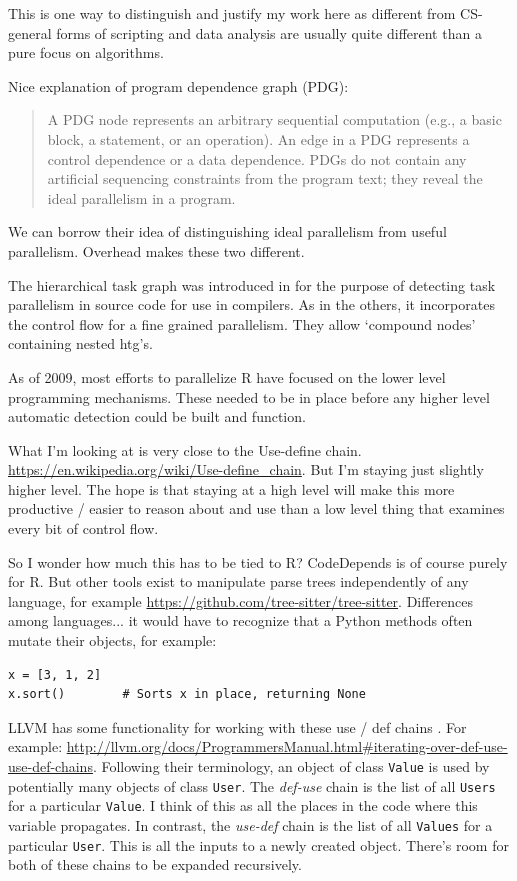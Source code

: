 \documentclass[12pt]{article}
\begin{document}
This is one way to distinguish and justify my work here as different from
CS- general forms of scripting and data analysis are usually quite
different than a pure focus on algorithms.

Nice explanation of program dependence graph (PDG):

\begin{quote}
    A PDG node represents
    an arbitrary sequential computation (e.g., a basic block, a
    statement, or an operation). An edge in a PDG represents
    a control dependence or a data dependence. PDGs do not
    contain any artificial sequencing constraints from the
    program text; they reveal the ideal parallelism in a
    program. \cite{sarkar1991automatic} 
\end{quote}

We can borrow their idea of distinguishing ideal parallelism from useful
parallelism. Overhead makes these two different.

The hierarchical task graph was introduced in \cite{girkar1992automatic}
for the purpose of detecting task parallelism in source code for use in compilers.
As in the others, it incorporates the control flow for a fine grained
parallelism. They allow `compound nodes' containing nested htg's.

As of 2009, most efforts to parallelize R have focused on the lower level
programming mechanisms. These needed to be in place before any higher level
automatic detection could be built and function.
\cite{schmidberger2009state} 

What I'm looking at is very close to the Use-define chain.
\url{https://en.wikipedia.org/wiki/Use-define_chain}. But I'm staying just
slightly higher level. The hope is that staying at a high level will make
this more productive / easier to reason about and use than a low level
thing that examines every bit of control flow.

So I wonder how much this has to be tied to R? CodeDepends is of course
purely for R. But other tools exist to manipulate parse trees independently
of any language, for example
\url{https://github.com/tree-sitter/tree-sitter}. Differences among
languages... it would have to recognize that a Python methods often mutate
their objects, for example:

\begin{verbatim}
x = [3, 1, 2]
x.sort()        # Sorts x in place, returning None
\end{verbatim}

LLVM has some functionality for working with these use / def chains
\cite{Lattner2004}. For example:
\url{http://llvm.org/docs/ProgrammersManual.html#iterating-over-def-use-use-def-chains}.
Following their terminology, an object of class \texttt{Value} is used by
potentially many objects of class \texttt{User}. The \emph{def-use} chain
is the list of all \texttt{Users} for a particular \texttt{Value}. I think
of this as all the places in the code where this variable propagates. In
contrast, the \emph{use-def} chain is the list of all \texttt{Values} for a
particular \texttt{User}. This is all the inputs to a newly
created object. There's room for both of these chains to be expanded recursively.
\end{document}
